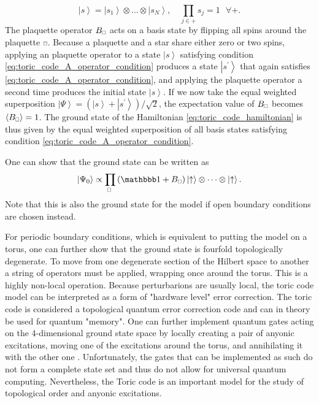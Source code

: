 \begin{equation}
	\label{eq:toric_code_A_operator_condition}
	\left|s\right\rangle = \left|s_1\right\rangle \otimes \dots \otimes \left|s_N\right\rangle, \quad \prod_{j\in+}s_j = 1 \,\,\,\,\forall +.
\end{equation}
The plaquette operator $B_{\scalebox{0.6}{$\square$}}$ acts on a basis state by flipping all spins around the plaquette $\scalebox{0.6}{$\square$}$. Because a plaquette and a star share either zero or two spins, applying an plaquette operator to a state $\left|s\right\rangle$ satisfying condition \eqref{eq:toric_code_A_operator_condition} produces a state $\left|s^\prime\right\rangle$ that again satisfies \eqref{eq:toric_code_A_operator_condition}, and applying the plaquette operator a second time produces the initial state $\left|s\right\rangle$. If we now take the equal weighted superposition $\left|\Psi\right\rangle = \left(\left|s\right\rangle+\left| s^\prime\right\rangle\right)/\sqrt{2}$, the expectation value of $B_{\scalebox{0.6}{$\square$}}$ becomes $\left\langle B_{\scalebox{0.6}{$\square$}}\right\rangle = 1$.
The ground state of the Hamiltonian \eqref{eq:toric_code_hamiltonian} is thus given by the equal weighted superposition of all basis states satisfying condition \eqref{eq:toric_code_A_operator_condition}. \par
One can show that the ground state can be written as
\begin{equation}
	\left|\Psi_0\right\rangle \propto \prod_{\scalebox{0.6}{$\square$}}\left(\id + B_{\scalebox{0.6}{$\square$}}\right) \left|\uparrow\right\rangle \otimes \dots \otimes \left|\uparrow\right\rangle.
\end{equation}
Note that this is also the ground state for the model if open boundary conditions are chosen instead. \par
For periodic boundary conditions, which is equivalent to putting the model on a torus, one can further show that the ground state is fourfold topologically degenerate. To move from one degenerate section of the Hilbert space to another a string of operators must be applied, wrapping once around the torus. This is a highly non-local operation. Because perturbarions are usually local, the toric code model can be interpreted as a form of "hardware level" error correction. The toric code is considered a topological quantum error correction code and can in theory be used for quantum "memory". One can further implement quantum gates acting on the 4-dimensional ground state space by locally creating a pair of anyonic excitations, moving one of the excitations around the torus, and annihilating it with the other one \cite{cite:fault_tolerant_quantum_computation_by_anyons}. Unfortunately, the gates that can be implemented as such do not form a complete state set and thus do not allow for universal quantum computing. Nevertheless, the Toric code is an important model for the study of topological order and anyonic excitations.
